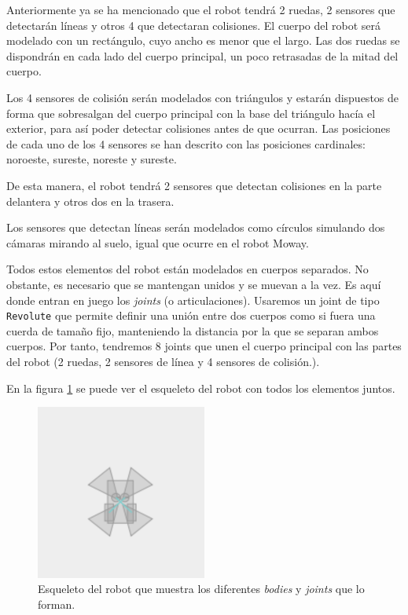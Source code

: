 Anteriormente ya se ha mencionado que el robot tendrá 2 ruedas, 2 sensores que detectarán líneas y otros 4 que detectaran colisiones. El cuerpo del robot será modelado con un rectángulo, cuyo ancho es menor que el largo. Las dos ruedas se dispondrán en cada lado del cuerpo principal, un poco retrasadas de la mitad del cuerpo.

Los 4 sensores de colisión serán modelados con triángulos y estarán dispuestos de forma que sobresalgan del cuerpo principal con la base del triángulo hacía el exterior, para así poder detectar colisiones antes de que ocurran. Las posiciones de cada uno de los 4 sensores se han descrito con las posiciones cardinales: noroeste, sureste, noreste y sureste. 

De esta manera, el robot tendrá 2 sensores que detectan colisiones en la parte delantera y otros dos en la trasera. 

Los sensores que detectan líneas serán modelados como círculos simulando dos cámaras mirando al suelo, igual que ocurre en el robot Moway. 

Todos estos elementos del robot están modelados en cuerpos separados. No obstante, es necesario que se mantengan unidos y se muevan a la vez. Es aquí donde entran en juego los \emph{joints} (o articulaciones). Usaremos un joint de tipo \texttt{Revolute} que permite definir una unión entre dos cuerpos como si fuera una cuerda de tamaño fijo, manteniendo la distancia por la que se separan ambos cuerpos. Por tanto, tendremos 8 joints que unen el cuerpo principal con las partes del robot (2 ruedas, 2 sensores de línea y 4 sensores de colisión.).


En la figura \ref{fig:robot-skel} se puede ver el esqueleto del robot con todos los elementos juntos. 

\begin{figure}[!ht]
	\begin{centering}
		\includegraphics[width=0.5\textwidth]{images/robot-skel.png}
			\caption{Esqueleto del robot que muestra los diferentes \emph{bodies} y \emph{joints} que lo forman.}
				\label{fig:robot-skel}
	\end{centering}
\end{figure}

